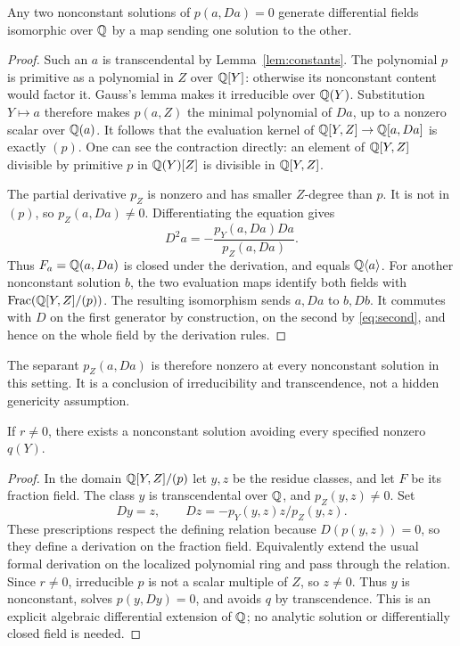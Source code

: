 \documentclass[11pt]{article}
\begin{document}
\begin{lemma}\label{lem:curve}
Any two nonconstant solutions of $p(a,Da)=0$ generate differential
fields isomorphic over $\mathbb Q$ by a map sending one solution to the other.
\end{lemma}
\begin{proof}
Such an $a$ is transcendental by Lemma~\ref{lem:constants}.
The polynomial $p$ is primitive as a polynomial in $Z$ over $\mathbb Q[Y]$:
otherwise its nonconstant content would factor it. Gauss's lemma
makes it irreducible over $\mathbb Q(Y)$. Substitution $Y\mapsto a$
therefore makes $p(a,Z)$ the minimal polynomial of $Da$, up to a
nonzero scalar over $\mathbb Q(a)$. It follows that the evaluation kernel
of $\mathbb Q[Y,Z]\to\mathbb Q[a,Da]$ is exactly $(p)$. One can see the contraction
directly: an element of $\mathbb Q[Y,Z]$ divisible by primitive $p$ in
$\mathbb Q(Y)[Z]$ is divisible in $\mathbb Q[Y,Z]$.

The partial derivative $p_Z$ is nonzero and has smaller $Z$-degree
than $p$. It is not in $(p)$, so $p_Z(a,Da)\ne0$. Differentiating
the equation gives
\begin{equation}\label{eq:second}
 D^2a=-\frac{p_Y(a,Da)Da}{p_Z(a,Da)}.
\end{equation}
Thus $F_a=\mathbb Q(a,Da)$ is closed under the derivation, and equals
$\mathbb Q\langle a\rangle$. For another nonconstant solution $b$,
the two evaluation maps identify both fields with
$\operatorname{Frac}(\mathbb Q[Y,Z]/(p))$. The resulting isomorphism sends
$a,Da$ to $b,Db$. It commutes with $D$ on the first generator by
construction, on the second by \eqref{eq:second}, and hence on the
whole field by the derivation rules.
\end{proof}

The separant $p_Z(a,Da)$ is therefore nonzero at every nonconstant
solution in this setting. It is a conclusion of irreducibility and
transcendence, not a hidden genericity assumption.

\begin{lemma}\label{lem:genericcurve}
If $r\ne0$, there exists a nonconstant solution avoiding every
specified nonzero $q(Y)$.
\end{lemma}
\begin{proof}
In the domain $\mathbb Q[Y,Z]/(p)$ let $y,z$ be the residue classes, and
let $F$ be its fraction field. The class $y$ is transcendental over
$\mathbb Q$, and $p_Z(y,z)\ne0$. Set
\[
 Dy=z,\qquad Dz=-p_Y(y,z)z/p_Z(y,z).
\]
These prescriptions respect the defining relation because
$D(p(y,z))=0$, so they define a derivation on the fraction field.
Equivalently extend the usual formal derivation on the localized
polynomial ring and pass through the relation. Since $r\ne0$,
irreducible $p$ is not a scalar multiple of $Z$, so $z\ne0$.
Thus $y$ is nonconstant, solves $p(y,Dy)=0$, and avoids $q$ by
transcendence. This is an explicit algebraic differential extension
of $\mathbb Q$; no analytic solution or differentially closed field is needed.
\end{proof}
\end{document}
